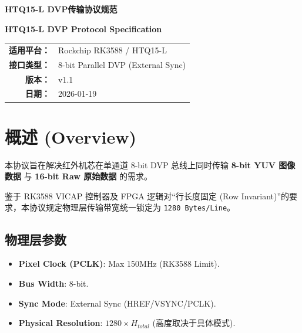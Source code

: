 \documentclass[UTF8]{ctexart}
\newcommand{\code}[1]{\colorbox{gray!10}{\lstinline[style=inlinecode]|#1|}}
\begin{document}

\begin{center}
    \vspace*{1cm}
    {\Huge \textbf{HTQ15-L DVP传输协议规范}}
    \vspace{0.5cm}
    
    {\Large \textbf{HTQ15-L DVP Protocol Specification}}
    \vspace{2cm}
    
    \begin{tabular}{rl}
        \textbf{适用平台：} & Rockchip RK3588 / HTQ15-L \\
        \textbf{接口类型：} & 8-bit Parallel DVP (External Sync) \\
        \textbf{版本：} & v1.1 \\
        \textbf{日期：} & 2026-01-19 \\
    \end{tabular}
\end{center}

\vspace{2cm}

\newpage


\section{概述 (Overview)}

本协议旨在解决红外机芯在单通道 8-bit DVP 总线上同时传输 \textbf{8-bit YUV 图像数据} 与 \textbf{16-bit Raw 原始数据} 的需求。

鉴于 RK3588 VICAP 控制器及 FPGA 逻辑对“行长度固定 (Row Invariant)”的要求，本协议规定物理层传输带宽统一锁定为 \code{1280 Bytes/Line}。

\subsection{物理层参数}
\begin{itemize}
    \item \textbf{Pixel Clock (PCLK)}: Max 150MHz (RK3588 Limit).
    \item \textbf{Bus Width}: 8-bit.
    \item \textbf{Sync Mode}: External Sync (HREF/VSYNC/PCLK).
    \item \textbf{Physical Resolution}: $1280 \times H_{total}$ (高度取决于具体模式).
\end{itemize}
\end{document}
